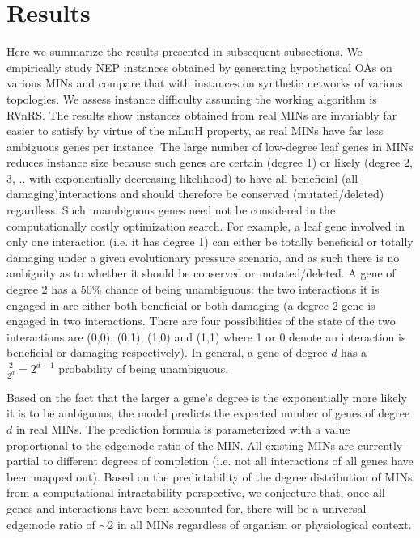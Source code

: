 \section{Results}
    Here we summarize the results presented in subsequent subsections. We empirically study NEP instances obtained by generating hypothetical OAs on various MINs and compare that with instances on synthetic networks of various topologies. We assess instance difficulty assuming the working algorithm is RVnRS. The results show instances obtained from  real MINs are invariably far easier to satisfy by virtue of the mLmH property, as real MINs have far less ambiguous genes per instance. The large number of low-degree leaf genes in MINs reduces  instance size because such genes are certain (degree 1) or likely (degree 2, 3, .. with exponentially decreasing likelihood) to have all-beneficial  (all-damaging)interactions and should therefore be conserved (mutated/deleted) regardless. Such unambiguous genes need not be considered in the computationally costly optimization search. For example, a leaf gene involved in only one interaction (i.e. it has degree 1)  can either be totally beneficial or totally damaging  under a given evolutionary pressure scenario, and as such there is no ambiguity as to whether it should be conserved or mutated/deleted. A gene of degree 2 has a 50\% chance of being unambiguous: the two interactions it is engaged in are either both beneficial or both damaging (a degree-2 gene is engaged in two interactions. There are four possibilities of the state of the two interactions are (0,0), (0,1), (1,0) and (1,1) where 1 or 0 denote an interaction is beneficial or damaging respectively).  In general, a gene of degree $d$ has a $\frac{2}{2^d} = 2^{d-1}$ probability of being unambiguous.


    Based on the fact that the larger a gene's degree is the exponentially more likely it is to be ambiguous,  the model predicts the expected number of genes of degree $d$ in real MINs. The prediction formula is parameterized with a value proportional to the  edge:node ratio of the MIN. All existing MINs are currently partial to different degrees of completion (i.e. not all interactions of all genes have been mapped out). Based on the predictability of the degree distribution of MINs from a computational intractability perspective, we conjecture that, once all genes and interactions have been accounted for, there will be a universal  edge:node ratio of ${\sim}$2 in all MINs regardless of organism or physiological context.


